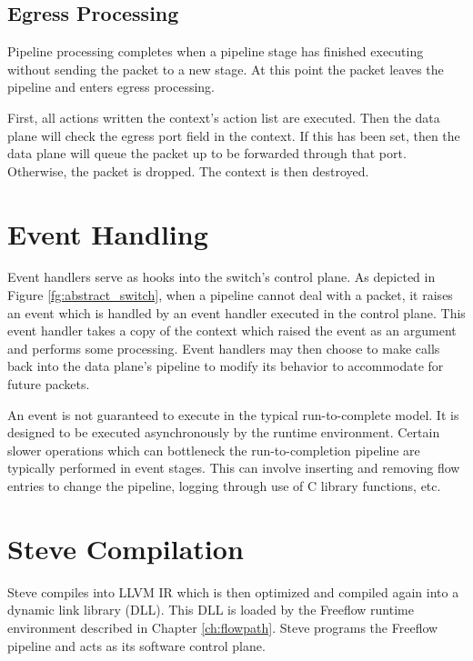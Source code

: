 \subsection{Egress Processing} \label{egress_desc}

Pipeline processing completes when a pipeline stage has finished executing
without sending the packet to a new stage. At this point the packet leaves the
pipeline and enters egress processing.

First, all actions written the context's action list are executed. Then the data
plane will check the egress port field in the context. If this has been set,
then the data plane will queue the packet up to be forwarded through that port.
Otherwise, the packet is dropped. The context is then destroyed.

\section{Event Handling} \label{events_desc}

Event handlers serve as hooks into the switch's control plane. 
As depicted in Figure \ref{fg:abstract_switch}, when a pipeline
cannot deal with a packet, it raises an event which is 
handled by an event handler executed in the control plane.
This event handler takes a copy of the context which raised the
event as an argument and performs some processing.
Event handlers may then choose to make calls back into the data plane's
pipeline to modify its behavior to accommodate for future packets.

An event is not guaranteed to execute in the typical run-to-complete model.
It is designed to be executed asynchronously by the runtime environment.
Certain slower operations which can
bottleneck the run-to-completion pipeline are typically performed in event
stages. This can involve inserting and removing flow entries to change the
pipeline, logging through use of C library functions, etc.

\section{Steve Compilation} \label{compile_desc}

Steve compiles into LLVM IR which is then optimized and compiled
again into a dynamic link library (DLL).
This DLL is loaded by the
Freeflow runtime environment described in Chapter \ref{ch:flowpath}.
Steve programs the Freeflow pipeline and acts as its software control
plane.
